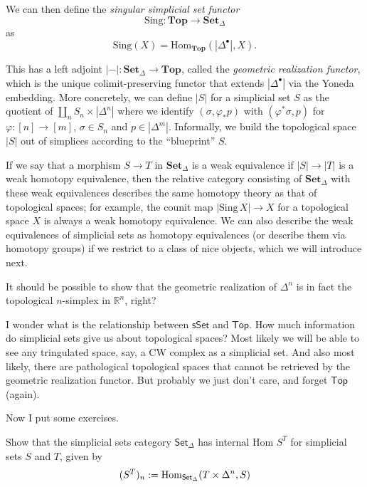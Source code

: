 We can then define the \emph{singular simplicial set functor}
\[
\mathrm{Sing}: \mathbf{Top} \to \mathbf{Set}_\Delta
\]
as
\[
\mathrm{Sing}(X) = \mathrm{Hom}_{\mathbf{Top}}(|\Delta^\bullet|, X).
\]

This has a left adjoint $|-|: \mathbf{Set}_\Delta \to \mathbf{Top}$, called the 
\emph{geometric realization functor}, which is the unique colimit-preserving functor 
that extends $|\Delta^\bullet|$ via the Yoneda embedding. More concretely, 
we can define $|S|$ for a simplicial set $S$ as the quotient of 
$\coprod_n S_n \times |\Delta^n|$ where we identify $(\sigma,\varphi_*p)$ with 
$(\varphi^*\sigma,p)$ for $\varphi:[n]\to[m]$, $\sigma \in S_n$ and $p \in |\Delta^m|$. 
Informally, we build the topological space $|S|$ out of simplices according to 
the ``blueprint'' $S$.

If we say that a morphism $S \to T$ in $\mathbf{Set}_\Delta$ is a weak equivalence if 
$|S| \to |T|$ is a weak homotopy equivalence, then the relative category consisting 
of $\mathbf{Set}_\Delta$ with these weak equivalences describes the same homotopy 
theory as that of topological spaces; for example, the counit map $|\mathrm{Sing}\,X| \to X$ 
for a topological space $X$ is always a weak homotopy equivalence. 
We can also describe the weak equivalences of simplicial sets as homotopy equivalences 
(or describe them via homotopy groups) if we restrict to a class of nice objects, 
which we will introduce next.

\begin{exercise}
\label{exercise-simplicial-n-simplex-is-topological-n-simplex}
It should be possible to show that
the geometric realization of $\Delta^n$ is in fact
the topological $n$-simplex in $\mathbb{R}^n$, right?
\end{exercise}

\noindent
I wonder what is the relationship between
$\mathsf{sSet}$ and $\mathsf{Top}$.
How much information do simplicial sets give
us about topological spaces?
Most likely we will be able to see any tringulated
space, say, a CW complex as a simplicial set.
And also most likely, there are pathological
topological spaces that cannot be retrieved by 
the geometric realization functor.
But probably we just don't care, and forget $\mathsf{Top}$ 
(again).

\medskip\noindent
Now I put some exercises.

\begin{exercise}[Observation 1.4.7]
\label{exercise-simplicial-sets-category-has-internal-Hom}
Show that the simplicial sets category  $\mathsf{Set}_\Delta$ has internal 
Hom $S^T$ for simplicial sets $S$ and $T$, given by
$$
(S^T)_n:=\mathop{\mathrm{Hom}}\nolimits_{\mathsf{Set}_\Delta}(T\times\Delta^n,S)
$$
\end{exercise}

